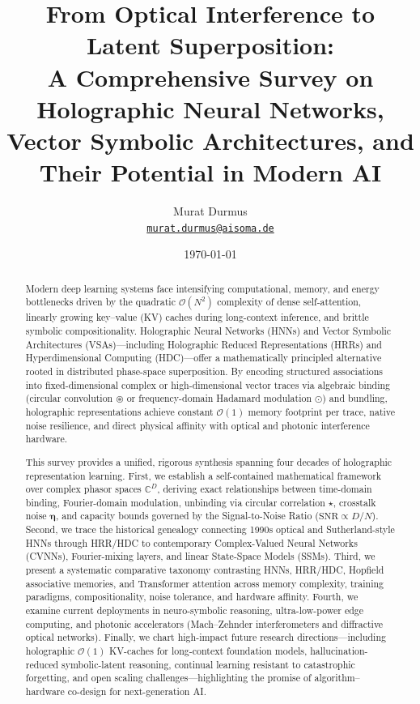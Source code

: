 \documentclass[11pt,a4paper]{article}
\title{\textbf{From Optical Interference to Latent Superposition:}\\
\Large A Comprehensive Survey on Holographic Neural Networks, Vector Symbolic Architectures, and Their Potential in Modern AI}
\author{
    Murat Durmus\\
    \small\href{mailto:murat.durmus@aisoma.de}{\texttt{murat.durmus@aisoma.de}}
}
\date{\today}
\newcommand{\vect}[1]{\boldsymbol{#1}}          %
\newcommand{\C}{\mathbb{C}}                     %
\newcommand{\cconv}{\circledast}                %
\newcommand{\ccorr}{\star}                      %
\newcommand{\hadamard}{\odot}                   %
\newcommand{\SNR}{\mathrm{SNR}}                 %
\newcommand{\bigo}[1]{\mathcal{O}\!\left(#1\right)}
\theoremstyle{plain}
\theoremstyle{definition}
\theoremstyle{remark}
\begin{document}
\maketitle

\begin{abstract}
Modern deep learning systems face intensifying computational, memory, and energy bottlenecks driven by the quadratic $\bigo{N^2}$ complexity of dense self-attention, linearly growing key--value (KV) caches during long-context inference, and brittle symbolic compositionality.
Holographic Neural Networks (HNNs) and Vector Symbolic Architectures (VSAs)---including Holographic Reduced Representations (HRRs) and Hyperdimensional Computing (HDC)---offer a mathematically principled alternative rooted in distributed phase-space superposition.
By encoding structured associations into fixed-dimensional complex or high-dimensional vector traces via algebraic binding (circular convolution $\cconv$ or frequency-domain Hadamard modulation $\hadamard$) and bundling, holographic representations achieve constant $\bigo{1}$ memory footprint per trace, native noise resilience, and direct physical affinity with optical and photonic interference hardware.

This survey provides a unified, rigorous synthesis spanning four decades of holographic representation learning.
First, we establish a self-contained mathematical framework over complex phasor spaces $\C^D$, deriving exact relationships between time-domain binding, Fourier-domain modulation, unbinding via circular correlation $\ccorr$, crosstalk noise $\vect{\eta}$, and capacity bounds governed by the Signal-to-Noise Ratio ($\SNR \propto D/N$).
Second, we trace the historical genealogy connecting 1990s optical and Sutherland-style HNNs through HRR/HDC to contemporary Complex-Valued Neural Networks (CVNNs), Fourier-mixing layers, and linear State-Space Models (SSMs).
Third, we present a systematic comparative taxonomy contrasting HNNs, HRR/HDC, Hopfield associative memories, and Transformer attention across memory complexity, training paradigms, compositionality, noise tolerance, and hardware affinity.
Fourth, we examine current deployments in neuro-symbolic reasoning, ultra-low-power edge computing, and photonic accelerators (Mach--Zehnder interferometers and diffractive optical networks).
Finally, we chart high-impact future research directions---including holographic $\bigo{1}$ KV-caches for long-context foundation models, hallucination-reduced symbolic-latent reasoning, continual learning resistant to catastrophic forgetting, and open scaling challenges---highlighting the promise of algorithm--hardware co-design for next-generation AI.
\end{abstract}
\end{document}

